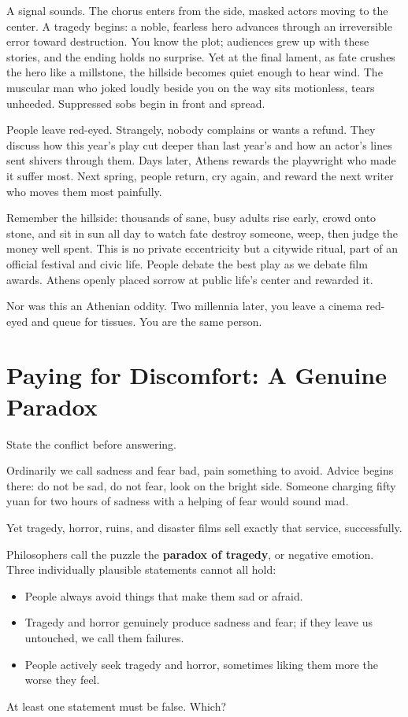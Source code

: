 A signal sounds. The chorus enters from the side, masked actors moving to the center. A tragedy begins: a noble, fearless hero advances through an irreversible error toward destruction. You know the plot; audiences grew up with these stories, and the ending holds no surprise. Yet at the final lament, as fate crushes the hero like a millstone, the hillside becomes quiet enough to hear wind. The muscular man who joked loudly beside you on the way sits motionless, tears unheeded. Suppressed sobs begin in front and spread.

People leave red-eyed. Strangely, nobody complains or wants a refund. They discuss how this year's play cut deeper than last year's and how an actor's lines sent shivers through them. Days later, Athens rewards the playwright who made it suffer most. Next spring, people return, cry again, and reward the next writer who moves them most painfully.

Remember the hillside: thousands of sane, busy adults rise early, crowd onto stone, and sit in sun all day to watch fate destroy someone, weep, then judge the money well spent. This is no private eccentricity but a citywide ritual, part of an official festival and civic life. People debate the best play as we debate film awards. Athens openly placed sorrow at public life's center and rewarded it.

Nor was this an Athenian oddity. Two millennia later, you leave a cinema red-eyed and queue for tissues. You are the same person.

\section{Paying for Discomfort: A Genuine Paradox}
State the conflict before answering.

Ordinarily we call sadness and fear bad, pain something to avoid. Advice begins there: do not be sad, do not fear, look on the bright side. Someone charging fifty yuan for two hours of sadness with a helping of fear would sound mad.

Yet tragedy, horror, ruins, and disaster films sell exactly that service, successfully.

Philosophers call the puzzle the \textbf{paradox of tragedy}, or negative emotion. Three individually plausible statements cannot all hold:

\begin{itemize}
\item People always avoid things that make them sad or afraid.
\item Tragedy and horror genuinely produce sadness and fear; if they leave us untouched, we call them failures.
\item People actively seek tragedy and horror, sometimes liking them more the worse they feel.
\end{itemize}
At least one statement must be false. Which?


